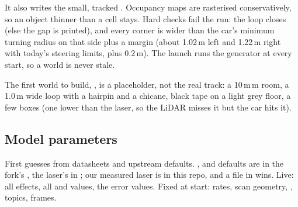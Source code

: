 \documentclass[11pt,a4paper]{article}
\begin{document}
It also writes the small, tracked . Occupancy maps are rasterised conservatively, so an object thinner than a cell stays. Hard checks fail the run: the loop closes (else the gap is printed), and every corner is wider than the car's minimum turning radius on that side plus a margin (about 1.02\,m left and 1.22\,m right with today's steering limits, plus 0.2\,m). The launch runs the generator at every start, so a world is never stale.

The first world to build, , is a placeholder, not the real track: a 10\,m\,m room, a 1.0\,m wide loop with a hairpin and a chicane, black tape on a light grey floor, a few boxes (one lower than the laser, so the LiDAR misses it but the car hits it).

\subsection{Model parameters}
First guesses from datasheets and upstream defaults. ,  and  defaults are in the fork's , the laser's in ; our measured laser is  in this repo, and a file in  wins. Live: all  effects, all  and  values, the  error values. Fixed at start: rates, scan geometry, , topics, frames.
\end{document}
